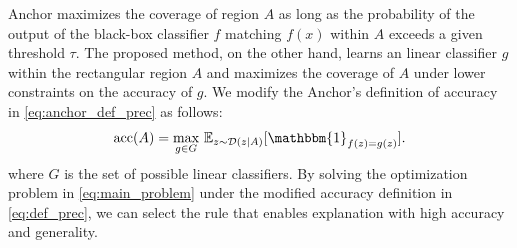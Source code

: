\documentclass[11pt]{article}
\begin{document}
Anchor maximizes the coverage of region $A$
as long as the probability of the output of the black-box classifier $f$ matching $f(x)$
within $A$ exceeds a given threshold $\tau$.
The proposed method, on the other hand, learns an linear classifier $g$
within the rectangular region $A$ and maximizes the coverage of $A$
under lower constraints on the accuracy of $g$.
We modify the Anchor's definition of accuracy in \cref{eq:anchor_def_prec}
as follows:
\begin{equation}
	\Prec(A)=\underset{g\in G}{\max}\ \mathbb{E}_{z\sim\mathcal{D}(z|A)}
	[\mathbbm{1}_{f(z)=g(z)}]. \label{eq:def_prec}
\end{equation}
where $G$ is the set of possible linear classifiers.
By solving the optimization problem in \cref{eq:main_problem}
under the modified accuracy definition in \cref{eq:def_prec},
we can select the rule that enables explanation with high accuracy and generality.
\end{document}
